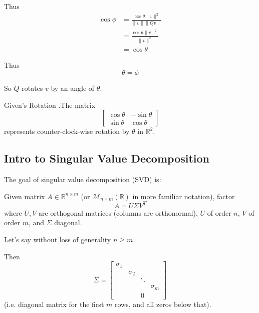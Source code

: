 \documentclass[12pt,letterpaper]{article}
\newcommand{\skipline}{\vspace{\baselineskip}}
\newcommand{\R}{\mathbb{R}}
\begin{document}
Thus
\begin{align}
	\cos\phi &= \frac{\cos\theta \lVert v \rVert^2}{\lVert v \rVert \lVert Qv \rVert} \\
	&= \frac{\cos\theta \lVert v \rVert^2}{\lVert v \rVert^2} \\
	&= \cos\theta
\end{align}

Thus
\begin{equation}
	\theta = \phi
\end{equation}

So $Q$ rotates $v$ by an angle of $\theta$.

\begin{theo}{Given's Rotation}
.The matrix
\begin{equation}
\begin{bmatrix}
	\cos\theta & -\sin\theta \\
	\sin\theta & \cos\theta
\end{bmatrix}
\end{equation}
represents counter-clock-wise rotation by $\theta$ in $\R^2$.
\label{thm:Givens_rotation}
\end{theo}

\subsection{Intro to Singular Value Decomposition}
The goal of singular value decomposition (SVD) is:

Given matrix $A \in \R^{n \times m}$ (or $\mathcal{M}_{n \times m}(\R)$ in more familiar notation), factor
\begin{equation}
	A = U \Sigma V^T
\end{equation}
where $U, V$ are orthogonal matrices (columns are orthonormal), $U$ of order $n$, $V$ of order $m$, and $\Sigma$ diagonal.


\skipline

Let's say without loss of generality $n \geq m$

Then
\begin{equation} \label{eq:Sigma}
\Sigma = \begin{bmatrix}
	\sigma_1 \\
	& \sigma_2 \\
	& & \ddots \\
	& & & \sigma_m
	\\ & & 0
\end{bmatrix}
\end{equation}
(i.e. diagonal matrix for the first $m$ rows, and all zeros below that).
\end{document}

